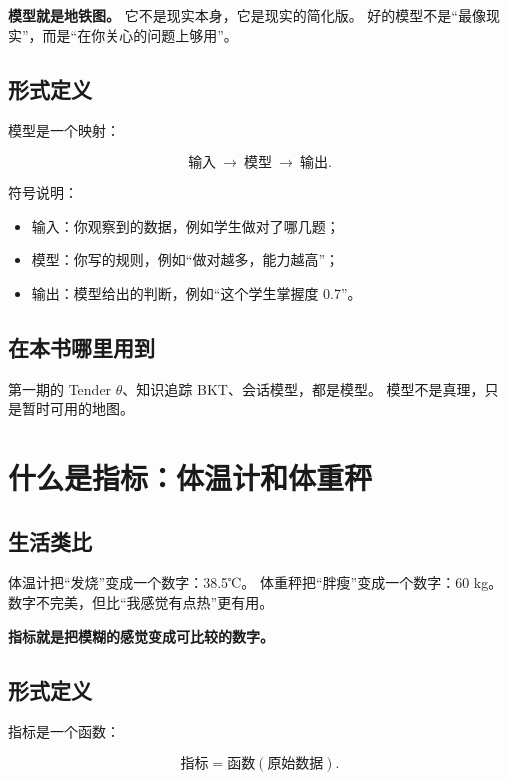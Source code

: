 \documentclass[UTF8,a4paper,11pt]{ctexart}
\begin{document}
\textbf{模型就是地铁图。}
它不是现实本身，它是现实的简化版。
好的模型不是“最像现实”，而是“在你关心的问题上够用”。

\subsection{形式定义}

模型是一个映射：

\begin{equation}
\text{输入}\ \rightarrow\ \text{模型}\ \rightarrow\ \text{输出}.
\end{equation}

符号说明：

\begin{itemize}[leftmargin=2em]
\item 输入：你观察到的数据，例如学生做对了哪几题；
\item 模型：你写的规则，例如“做对越多，能力越高”；
\item 输出：模型给出的判断，例如“这个学生掌握度 0.7”。
\end{itemize}

\subsection{在本书哪里用到}

第一期的 Tender $\theta$、知识追踪 BKT、会话模型，都是模型。
模型不是真理，只是暂时可用的地图。


\section{什么是指标：体温计和体重秤}

\subsection{生活类比}

体温计把“发烧”变成一个数字：38.5℃。
体重秤把“胖瘦”变成一个数字：60 kg。
数字不完美，但比“我感觉有点热”更有用。

\textbf{指标就是把模糊的感觉变成可比较的数字。}

\subsection{形式定义}

指标是一个函数：

\begin{equation}
\text{指标}=\text{函数}(\text{原始数据}).
\end{equation}
\end{document}
